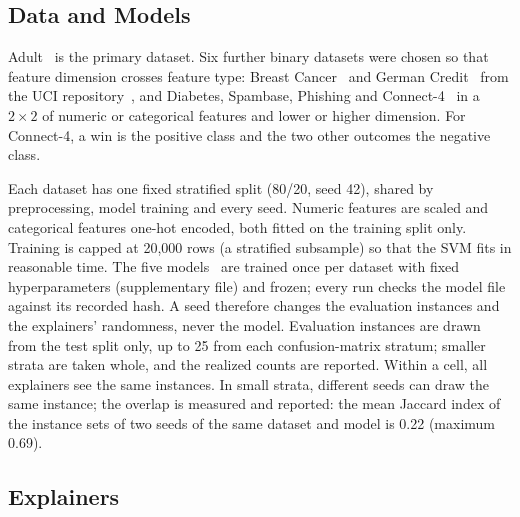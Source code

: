 \documentclass[11pt,a4paper]{article}
\begin{document}
\subsection{Data and Models}
\label{sec:data}

Adult~\cite{kohavi1996scaling,becker1996adult} is the primary dataset. Six
further binary datasets were chosen so that feature dimension crosses
feature type: Breast Cancer~\cite{wolberg1993breast} and German
Credit~\cite{hofmann1994statlog} from the UCI repository~\cite{dua2019uci}, and Diabetes, Spambase,
Phishing and
Connect-4~\cite{smith1988adap,hopkins1999spambase,mohammad2012phishing,tromp1995connect4}
in a $2 \times 2$ of
numeric or categorical features and lower or higher dimension. For
Connect-4, a win is the positive class and the two other outcomes the
negative class.

Each dataset has one fixed stratified split (80/20, seed 42), shared by
preprocessing, model training and every seed. Numeric features are scaled
and categorical features one-hot encoded, both fitted on the training
split only. Training is capped at 20,000 rows (a stratified subsample) so
that the SVM fits in reasonable time. The five
models~\cite{breiman2001random,chen2016xgboost} are trained once per dataset
with fixed hyperparameters (supplementary file) and frozen; every run checks
the model file against its recorded hash. A seed therefore changes the
evaluation instances and the explainers' randomness, never the model.
Evaluation instances are drawn from the test split only, up to 25 from each
confusion-matrix stratum; smaller strata are taken whole, and the realized
counts are reported. Within a cell, all explainers see the same instances.
In small strata, different seeds can draw the same instance; the overlap
is measured and reported: the mean Jaccard index of the instance sets of
two seeds of the same dataset and model is 0.22 (maximum 0.69).

\subsection{Explainers}
\label{sec:explainers}
\end{document}
